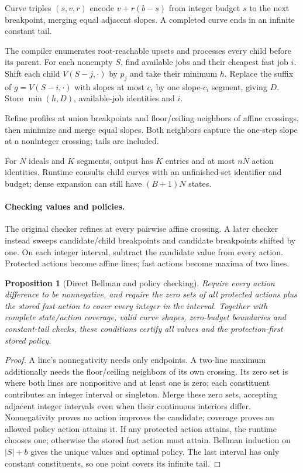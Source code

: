 \documentclass[acmsmall,screen,review,anonymous]{acmart}
\newtheorem{proposition}[theorem]{Proposition}
\begin{document}
Curve triples $(s,v,r)$ encode $v+r(b-s)$ from integer budget $s$ to the next breakpoint, merging equal adjacent slopes. A completed curve ends in an infinite constant tail.

The compiler enumerates root-reachable upsets and processes every child before its parent. For each nonempty $S$, find available jobs and their cheapest fast job $i$. Shift each child $V(S-j,\cdot)$ by $p_j$ and take their minimum $h$. Replace the suffix of $g=V(S-i,\cdot)$ with slopes at most $c_i$ by one slope-$c_i$ segment, giving $D$. Store $\min(h,D)$, available-job identities and $i$.

Refine profiles at union breakpoints and floor/ceiling neighbors of affine crossings, then minimize and merge equal slopes. Both neighbors capture the one-step slope at a noninteger crossing; tails are included.

For $N$ ideals and $K$ segments, output has $K$ entries and at most $nN$ action identities. Runtime consults child curves with an unfinished-set identifier and budget; dense expansion can still have $(B+1)N$ states.

\paragraph{Checking values and policies.}
The original checker refines at every pairwise affine crossing. A later checker instead sweeps candidate/child breakpoints and candidate breakpoints shifted by one. On each integer interval, subtract the candidate value from every action. Protected actions become affine lines; fast actions become maxima of two lines.

\begin{proposition}[Direct Bellman and policy checking]
\label{prop:sweep}
Require every action difference to be nonnegative, and require the zero sets of all protected actions plus the stored fast action to cover every integer in the interval. Together with complete state/action coverage, valid curve shapes, zero-budget boundaries and constant-tail checks, these conditions certify all values and the protection-first stored policy.
\end{proposition}
\begin{proof}
A line's nonnegativity needs only endpoints. A two-line maximum additionally needs the floor/ceiling neighbors of its own crossing. Its zero set is where both lines are nonpositive and at least one is zero; each constituent contributes an integer interval or singleton. Merge these zero sets, accepting adjacent integer intervals even when their continuous interiors differ. Nonnegativity proves no action improves the candidate; coverage proves an allowed policy action attains it. If any protected action attains, the runtime chooses one; otherwise the stored fast action must attain. Bellman induction on $|S|+b$ gives the unique values and optimal policy. The last interval has only constant constituents, so one point covers its infinite tail.
\end{proof}
\end{document}

